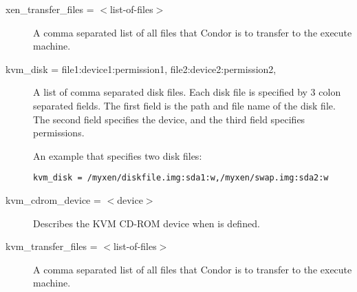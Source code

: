 \begin{description}

\item[xen\_transfer\_files = $<$list-of-files$>$]
A comma separated list of all files that Condor is to transfer
to the execute machine.


\item[kvm\_disk = file1:device1:permission1, file2:device2:permission2, \Dots]
A list of comma separated disk files.
Each disk file is specified by 3 colon separated fields.
The first field is the path and file name of the disk file.
The second field specifies the device, and
the third field specifies permissions.

An example that specifies two disk files:
\footnotesize
\begin{verbatim}
kvm_disk = /myxen/diskfile.img:sda1:w,/myxen/swap.img:sda2:w
\end{verbatim}
\normalsize


\item[kvm\_cdrom\_device = $<$device$>$]
Describes the KVM CD-ROM device when
 is defined.


\item[kvm\_transfer\_files = $<$list-of-files$>$]
A comma separated list of all files that Condor is to transfer
to the execute machine.

\end{description} 

